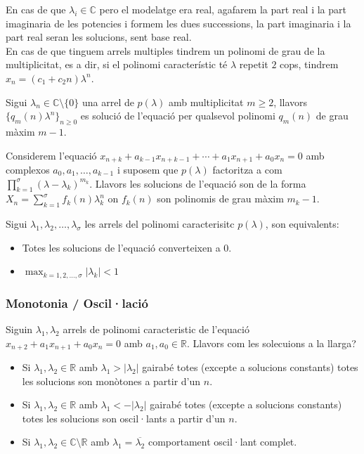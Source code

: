 \documentclass[../main.tex]{subfiles}
\begin{document}
En cas de que $\lambda_i \in \mathbb{C}$ pero el modelatge era real, agafarem la part real i la part imaginaria de les potencies i formem les dues successions, la part imaginaria i la part real seran les solucions, sent base real.\\
En cas de que tinguem arrels multiples tindrem un polinomi de grau de la multiplicitat, es a dir, si el polinomi característic té $\lambda$ repetit $2$ cops, tindrem $x_n = (c_1 + c_2n)\lambda^n$.\\
\begin{proposicio}
    Sigui $\lambda_n \in \mathbb{C} \setminus \{0\}$ una arrel de $p(\lambda)$ amb multiplicitat $m \geq 2$, llavors $\{q_m(n)\lambda^n\}_{n\geq 0}$ es solució de l'equació per qualsevol polinomi $q_m(n)$ de grau màxim $m-1$.
\end{proposicio}
\begin{teorema}
    Considerem l'equació $x_{n+k} + a_{k-1}x_{n+k-1} + \cdots + a_1x_{n+1} + a_0x_n = 0$ amb complexos $a_0, a_1, \dots, a_{k-1}$ i suposem que $p(\lambda)$ factoritza a com $\prod_{k=1}^\sigma (\lambda - \lambda_k)^{m_k}$. Llavors les solucions de l'equació son de la forma $X_n = \sum_{k=1}^\sigma f_k(n)\lambda_k^n$ on $f_k(n)$ son polinomis de grau màxim $m_k-1$.
\end{teorema}
\begin{corolari}
    Sigui $\lambda_1, \lambda_2, \dots, \lambda_\sigma$ les arrels del polinomi caracterisitc $p(\lambda)$, son equivalents:
    \begin{itemize}
        \item Totes les solucions de l'equació converteixen a $0$.
        \item $\max_{k = 1, 2, \dots, \sigma}\left|\lambda_k\right| < 1$
    \end{itemize}
\end{corolari}
\subsubsection{Monotonia / Oscil·lació}
Siguin $\lambda_1, \lambda_2$ arrels de polinomi caracteristic de l'equació $x_{n+2} + a_1x_{n+1} + a_0x_n = 0$ amb $a_1, a_0 \in \mathbb{R}$. Llavors com les solecuions a la llarga?\\
\begin{itemize}
    \item Si $\lambda_1, \lambda_2 \in \mathbb{R}$ amb $\lambda_1 > |\lambda_2|$ gairabé totes (excepte a solucions constants) totes les solucions son monòtones a partir d'un $n$.
    \item Si $\lambda_1, \lambda_2 \in \mathbb{R}$ amb $\lambda_1 < -|\lambda_2|$ gairabé totes (excepte a solucions constants) totes les solucions son oscil·lants a partir d'un $n$.
    \item Si $\lambda_1, \lambda_2 \in \mathbb{C}\setminus\mathbb{R}$ amb $\lambda_1 = \overline{\lambda_2}$ comportament oscil·lant complet.
\end{itemize}
\end{document}
